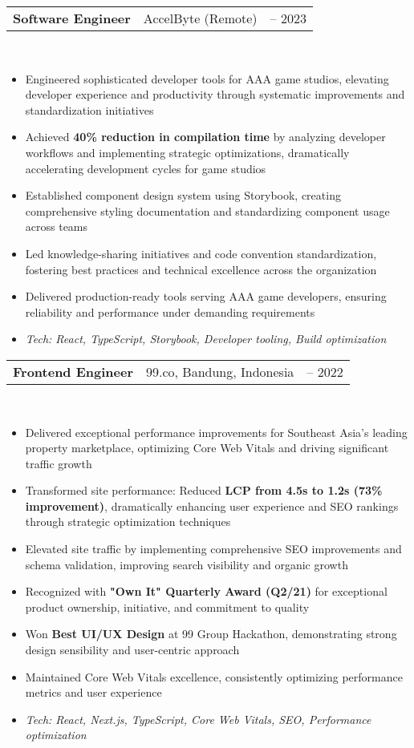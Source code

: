 \documentclass[a4paper, 11pt]{article}
\newcommand{\resumeItem}[1]{
  \item\small{
    {#1 \vspace{-2pt}}
  }
}
\newcommand{\resumeSubheading}[4]{
  \vspace{-2pt}\item
    \begin{tabularx}{0.987\textwidth}[t]{
  >{\raggedright\arraybackslash}X
  >{\centering\arraybackslash}X
  >{\raggedleft\arraybackslash}X }
      \textbf{#1} & #2 & #3 \\
    \end{tabularx}
    \textit{\small#4}\\
    \vspace{-7pt}
}
\newcommand{\resumeItemListStart}{\begin{itemize}[leftmargin=0.22in]}
\newcommand{\resumeItemListEnd}{\end{itemize}\vspace{-20pt}}
\begin{document}
        \resumeSubheading
            {Software Engineer}{AccelByte (Remote)}{2022 -- 2023}{}
            \resumeItemListStart
                \resumeItem{Engineered sophisticated developer tools for AAA game studios, elevating developer experience and productivity through systematic improvements and standardization initiatives}
                \resumeItem{Achieved \textbf{40\% reduction in compilation time} by analyzing developer workflows and implementing strategic optimizations, dramatically accelerating development cycles for game studios}
                \resumeItem{Established component design system using Storybook, creating comprehensive styling documentation and standardizing component usage across teams}
                \resumeItem{Led knowledge-sharing initiatives and code convention standardization, fostering best practices and technical excellence across the organization}
                \resumeItem{Delivered production-ready tools serving AAA game developers, ensuring reliability and performance under demanding requirements}
                \resumeItem{\textit{Tech: React, TypeScript, Storybook, Developer tooling, Build optimization}}
            \resumeItemListEnd

        \resumeSubheading
            {Frontend Engineer}{99.co, Bandung, Indonesia}{2020 -- 2022}{}
            \resumeItemListStart
                \resumeItem{Delivered exceptional performance improvements for Southeast Asia's leading property marketplace, optimizing Core Web Vitals and driving significant traffic growth}
                \resumeItem{Transformed site performance: Reduced \textbf{LCP from 4.5s to 1.2s (73\% improvement)}, dramatically enhancing user experience and SEO rankings through strategic optimization techniques}
                \resumeItem{Elevated site traffic by implementing comprehensive SEO improvements and schema validation, improving search visibility and organic growth}
                \resumeItem{Recognized with \textbf{"Own It" Quarterly Award (Q2/21)} for exceptional product ownership, initiative, and commitment to quality}
                \resumeItem{Won \textbf{Best UI/UX Design} at 99 Group Hackathon, demonstrating strong design sensibility and user-centric approach}
                \resumeItem{Maintained Core Web Vitals excellence, consistently optimizing performance metrics and user experience}
                \resumeItem{\textit{Tech: React, Next.js, TypeScript, Core Web Vitals, SEO, Performance optimization}}
            \resumeItemListEnd
\end{document}
